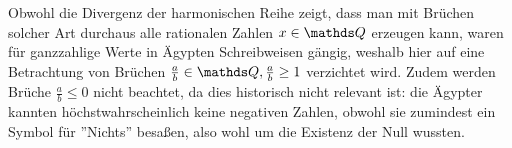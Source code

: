 Obwohl die Divergenz der harmonischen Reihe zeigt, dass man mit Brüchen solcher Art durchaus alle rationalen Zahlen $x \in \Q$ erzeugen kann, waren für ganzzahlige Werte in Ägypten Schreibweisen gängig, weshalb hier auf eine Betrachtung von Brüchen $\frac{a}{b}\in \Q, \frac{a}{b} \geq 1$ verzichtet wird. Zudem werden Brüche $\frac{a}{b} \leq 0$ nicht beachtet, da dies historisch nicht relevant ist: die Ägypter kannten höchstwahrscheinlich keine negativen Zahlen, obwohl sie zumindest ein Symbol für ''Nichts'' besaßen, also wohl um die Existenz der Null wussten.